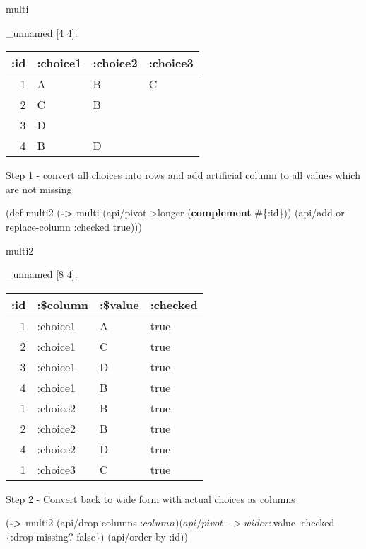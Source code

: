 \documentclass[]{article}
\newenvironment{Shaded}{\begin{snugshade}}{\end{snugshade}}
\newcommand{\KeywordTok}[1]{\textcolor[rgb]{0.13,0.29,0.53}{\textbf{#1}}}
\newcommand{\FunctionTok}[1]{\textcolor[rgb]{0.00,0.00,0.00}{#1}}
\newcommand{\VariableTok}[1]{\textcolor[rgb]{0.00,0.00,0.00}{#1}}
\newcommand{\BuiltInTok}[1]{#1}
\newcommand{\AttributeTok}[1]{\textcolor[rgb]{0.77,0.63,0.00}{#1}}
\newcommand{\NormalTok}[1]{#1}
\begin{document}
\begin{Shaded}
\begin{Highlighting}[]
\NormalTok{multi}
\end{Highlighting}
\end{Shaded}

\_unnamed {[}4 4{]}:

\begin{longtable}[]{@{}rlll@{}}
\toprule
:id & :choice1 & :choice2 & :choice3\tabularnewline
\midrule
\endhead
1 & A & B & C\tabularnewline
2 & C & B &\tabularnewline
3 & D & &\tabularnewline
4 & B & D &\tabularnewline
\bottomrule
\end{longtable}

Step 1 - convert all choices into rows and add artificial column to all
values which are not missing.

\begin{Shaded}
\begin{Highlighting}[]
\NormalTok{(}\BuiltInTok{def}\FunctionTok{ multi2 }\NormalTok{(}\KeywordTok{->}\NormalTok{ multi}
\NormalTok{                (api/pivot->longer (}\KeywordTok{complement}\NormalTok{ #\{}\AttributeTok{:id}\NormalTok{\}))}
\NormalTok{                (api/add-or-replace-column }\AttributeTok{:checked} \VariableTok{true}\NormalTok{)))}
\end{Highlighting}
\end{Shaded}

\begin{Shaded}
\begin{Highlighting}[]
\NormalTok{multi2}
\end{Highlighting}
\end{Shaded}

\_unnamed {[}8 4{]}:

\begin{longtable}[]{@{}rlll@{}}
\toprule
:id & :\$column & :\$value & :checked\tabularnewline
\midrule
\endhead
1 & :choice1 & A & true\tabularnewline
2 & :choice1 & C & true\tabularnewline
3 & :choice1 & D & true\tabularnewline
4 & :choice1 & B & true\tabularnewline
1 & :choice2 & B & true\tabularnewline
2 & :choice2 & B & true\tabularnewline
4 & :choice2 & D & true\tabularnewline
1 & :choice3 & C & true\tabularnewline
\bottomrule
\end{longtable}

Step 2 - Convert back to wide form with actual choices as columns

\begin{Shaded}
\begin{Highlighting}[]
\NormalTok{(}\KeywordTok{->}\NormalTok{ multi2}
\NormalTok{    (api/drop-columns :$column)}
\NormalTok{    (api/pivot->wider :$value }\AttributeTok{:checked}\NormalTok{ \{}\AttributeTok{:drop-missing}\NormalTok{? }\VariableTok{false}\NormalTok{\})}
\NormalTok{    (api/order-by }\AttributeTok{:id}\NormalTok{))}
\end{Highlighting}
\end{Shaded}
\end{document}
